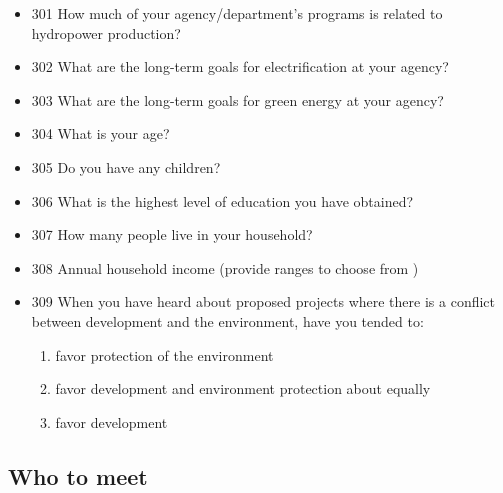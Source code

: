 \documentclass[11pt,english]{article}
\theoremstyle{plain} \newtheorem{claim}{Claim}
\theoremstyle{plain} \newtheorem{prop}{Proposition}
\theoremstyle{plain} \newtheorem{hypo}{Hypothesis}
\begin{document}
\begin{itemize}
\item[] 301 How much of your agency/department's programs is related to hydropower production? 

\item[] 302 What are the long-term goals for electrification at your agency? 

\item[] 303 What are the long-term goals for green energy at your agency? 

\item[] 304 What is your age?

\item[] 305 Do you have any children? 

\item[] 306 What is the highest level of education you have obtained? 

\item[] 307 How many people live in your household? 

\item[] 308 Annual household income (provide ranges to choose from )

\item[] 309 When you have heard about proposed projects where there is a conflict between development and the environment, have you tended to:
\begin{enumerate}
\item favor protection of the environment
\item favor development and environment protection about equally
\item favor development
\end{enumerate}
\end{itemize}

\subsection{Who to meet}
\end{document}
